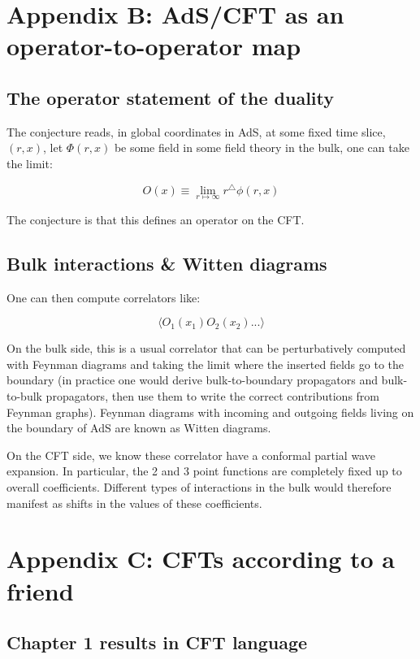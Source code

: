 \section{Appendix B: AdS/CFT as an operator-to-operator map}
\subsection{ The operator statement of the duality }

The conjecture reads, in global coordinates in AdS, at some fixed time slice, $(r, x)$, let $\Phi(r, x)$ be some field in some field theory in the bulk, one can take the limit:

$$O(x) \equiv \lim_{r \mapsto \infty }r^\triangle\phi(r, x)$$

The conjecture is that this defines an operator on the CFT. 

\subsection{ Bulk interactions \& Witten diagrams}

One can then compute correlators like:

$$\langle O_1(x_1) O_2(x_2) ...\rangle$$

On the bulk side, this is a usual correlator that can be perturbatively computed with Feynman diagrams and taking the limit where the inserted fields go to the boundary (in practice one would derive bulk-to-boundary propagators and bulk-to-bulk propagators, then use them to write the correct contributions from Feynman graphs). Feynman diagrams with incoming and outgoing fields living on the boundary of AdS are known as Witten diagrams.

On the CFT side, we know these correlator have a conformal partial wave expansion. In particular, the 2 and 3 point functions are completely fixed up to overall coefficients. Different types of interactions in the bulk would therefore manifest as shifts in the values of these coefficients. 

\section{Appendix C: CFTs according to a friend}

\subsection{ Chapter 1 results in CFT language}

